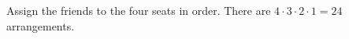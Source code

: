 Assign the friends to the four seats in order. There are $4\cdot 3\cdot 2\cdot 1=\boxed{24}$ arrangements.
